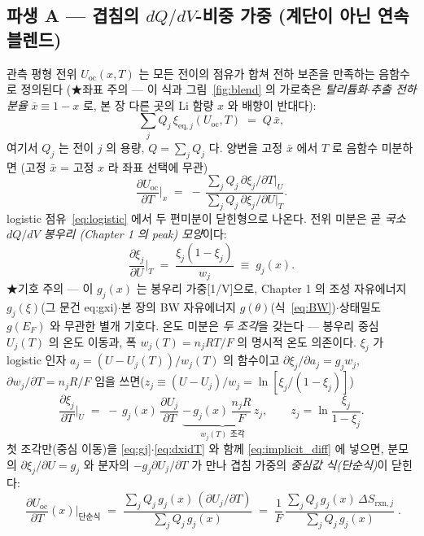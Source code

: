 \documentclass[11pt,a4paper]{article}
\newcommand{\rxn}{\mathrm{rxn}}
\newcommand{\eq}{\mathrm{eq}}
\newcommand{\oc}{\mathrm{oc}}
\begin{document}
\subsection{파생 A — 겹침의 $dQ/dV$-비중 가중 (계단이 아닌 연속 블렌드)}\label{ssec:overlap}
관측 평형 전위 $U_\oc(x,T)$ 는 모든 전이의 점유가 합쳐 전하 보존을 만족하는 음함수로 정의된다
(★좌표 주의 — 이 식과 그림~\ref{fig:blend} 의 가로축은 \emph{탈리튬화$\cdot$추출 전하 분율}
$\bar x\equiv1-x$ 로, 본 장 다른 곳의 Li 함량 $x$ 와 배향이 반대다):
\begin{equation}
\sum_j Q_j\,\xi_{\eq,j}(U_\oc,T) \;=\; Q\,\bar x,
\label{eq:implicit}
\end{equation}
여기서 $Q_j$ 는 전이 $j$ 의 용량, $Q=\sum_j Q_j$ 다. 양변을 고정 $\bar x$ 에서 $T$ 로 음함수 미분하면
(고정 $\bar x$ = 고정 $x$ 라 좌표 선택에 무관)
\begin{equation}
\frac{\partial U_\oc}{\partial T}\Big|_x
\;=\; -\,\frac{\sum_j Q_j\,\partial\xi_j/\partial T|_U}{\sum_j Q_j\,\partial\xi_j/\partial U|_T}.
\label{eq:implicit_diff}
\end{equation}
logistic 점유~\eqref{eq:logistic} 에서 두 편미분이 닫힌형으로 나온다. 전위 미분은 곧 \emph{국소 $dQ/dV$ 봉우리
(Chapter 1 의 peak) 모양}이다:
\begin{equation}
\frac{\partial\xi_j}{\partial U}\Big|_T \;=\; \frac{\xi_j(1-\xi_j)}{w_j} \;\equiv\; g_j(x).
\label{eq:gj}
\end{equation}
★기호 주의 — 이 $g_j(x)$ 는 봉우리 가중[1/V]으로, Chapter 1 의 조성 자유에너지 $g_j(\xi)$(그 문건 eq:gxi)$\cdot$본
장의 BW 자유에너지 $g(\theta)$(식~\eqref{eq:BW})$\cdot$상태밀도 $g(E_F)$ 와 무관한 별개 기호다.
온도 미분은 \emph{두 조각}을 갖는다 — 봉우리 중심 $U_j(T)$ 의 온도 이동과, 폭 $w_j(T)=n_jRT/F$ 의 명시적 온도
의존이다. $\xi_j$ 가 logistic 인자 $a_j=(U-U_j(T))/w_j(T)$ 의 함수이고 $\partial\xi_j/\partial a_j=g_j w_j$,
$\partial w_j/\partial T=n_jR/F$ 임을 쓰면($z_j\equiv(U-U_j)/w_j=\ln[\xi_j/(1-\xi_j)]$)
\begin{equation}
\frac{\partial\xi_j}{\partial T}\Big|_U
\;=\; -\,g_j(x)\,\frac{\partial U_j}{\partial T}
\;\underbrace{-\,g_j(x)\,\frac{n_jR}{F}\,z_j}_{w_j(T)\text{ 조각}},
\qquad z_j=\ln\frac{\xi_j}{1-\xi_j}.
\label{eq:dxidT}
\end{equation}
첫 조각만(중심 이동)을 \eqref{eq:gj}$\cdot$\eqref{eq:dxidT} 와 함께 \eqref{eq:implicit_diff} 에 넣으면, 분모의
$\partial\xi_j/\partial U=g_j$ 와 분자의 $-g_j\partial U_j/\partial T$ 가 만나 겹침 가중의 \emph{중심값 식(단순식)}이
닫힌다:
\begin{equation}
\boxed{\;\frac{\partial U_\oc}{\partial T}(x)\Big|_{\text{단순식}}
\;=\; \frac{\sum_j Q_j\,g_j(x)\,(\partial U_j/\partial T)}{\sum_j Q_j\,g_j(x)}
\;=\; \frac1F\,\frac{\sum_j Q_j\,g_j(x)\,\Delta S_{\rxn,j}}{\sum_j Q_j\,g_j(x)}\;.}
\label{eq:weighted}
\end{equation}
\end{document}
